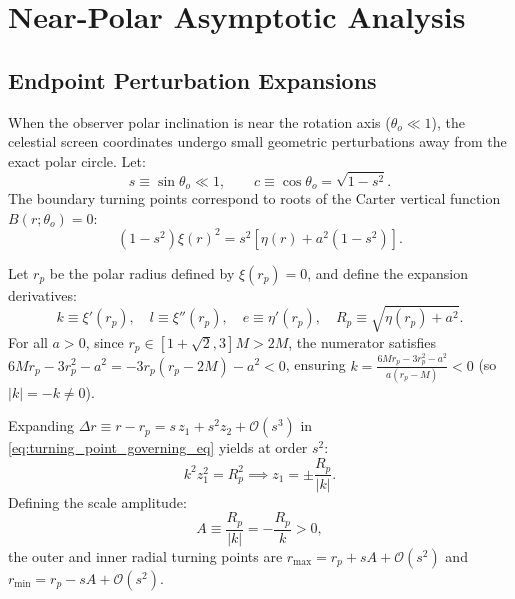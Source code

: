 \section{Near-Polar Asymptotic Analysis}
\label{sec:near_polar_asymptotics}

\subsection{Endpoint Perturbation Expansions}
When the observer polar inclination is near the rotation axis ($\theta_o \ll 1$), the celestial screen coordinates undergo small geometric perturbations away from the exact polar circle. Let:
\begin{equation}
    s \equiv \sin\theta_o \ll 1, \qquad c \equiv \cos\theta_o = \sqrt{1 - s^2}.
\end{equation}
The boundary turning points correspond to roots of the Carter vertical function $B(r; \theta_o) = 0$:
\begin{equation}
    (1 - s^2) \xi(r)^2 = s^2 \left[ \eta(r) + a^2(1 - s^2) \right].
    \label{eq:turning_point_governing_eq}
\end{equation}

Let $r_p$ be the polar radius defined by $\xi(r_p) = 0$, and define the expansion derivatives:
\begin{equation}
    k \equiv \xi'(r_p), \quad l \equiv \xi''(r_p), \quad e \equiv \eta'(r_p), \quad R_p \equiv \sqrt{\eta(r_p) + a^2}.
    \label{eq:asymptotic_derivative_defs}
\end{equation}
For all $a > 0$, since $r_p \in [1+\sqrt{2}, 3]M > 2M$, the numerator satisfies $6Mr_p - 3r_p^2 - a^2 = -3r_p(r_p - 2M) - a^2 < 0$, ensuring $k = \frac{6Mr_p - 3r_p^2 - a^2}{a(r_p - M)} < 0$ (so $|k| = -k \neq 0$).

Expanding $\Delta r \equiv r - r_p = s\,z_1 + s^2 z_2 + \mathcal{O}(s^3)$ in \eqref{eq:turning_point_governing_eq} yields at order $s^2$:
\begin{equation}
    k^2 z_1^2 = R_p^2 \implies z_1 = \pm \frac{R_p}{|k|}.
\end{equation}
Defining the scale amplitude:
\begin{equation}
    A \equiv \frac{R_p}{|k|} = -\frac{R_p}{k} > 0,
    \label{eq:def_scale_amplitude_A}
\end{equation}
the outer and inner radial turning points are $r_{\max} = r_p + s A + \mathcal{O}(s^2)$ and $r_{\min} = r_p - s A + \mathcal{O}(s^2)$.

